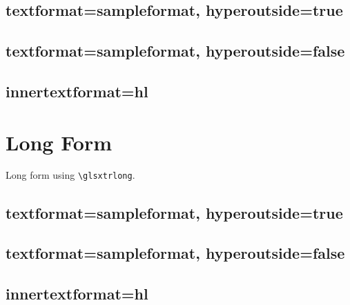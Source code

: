 \documentclass{report}
\begin{document}
\section{textformat=sampleformat, hyperoutside=true}


\section{textformat=sampleformat, hyperoutside=false}


\section{innertextformat=hl}



\chapter{Long Form}
Long form using \verb|\glsxtrlong|.


\section{textformat=sampleformat, hyperoutside=true}


\section{textformat=sampleformat, hyperoutside=false}


\section{innertextformat=hl}
\end{document}
